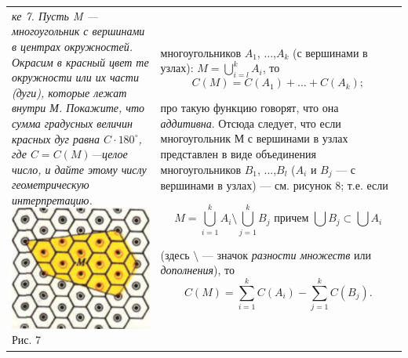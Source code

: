 \newpage
\thispagestyle{empty}
\begin{tabular}{p{50mm} p{120mm}}

\textit{ке 7. Пусть M --- многоугольник с вершинами в центрах окружностей. Окрасим в красный цвет те окружности или их части (дуги), которые лежат внутри М. Покажите, что сумма градусных величин красных дуг равна $C\cdot180^{\circ}$, где $C=C(M)$---целое число, и дайте этому числу геометрическую интерпретацию.}
\includegraphics[width=1.0\linewidth]{image2}
Рис. 7

&

многоугольников $A_1$, ...,$A_k$ (с вершинами в узлах):
{
\vspace{-4mm}
$M=\bigcup\limits_{i=l}^k A_i$, то $$C(M)=C(A_1)+...+C(A_k);$$
}

{
\vspace{-3mm}
про такую функцию говорят, что она \textit{аддитивна}. Отсюда следует, что если многоугольник М с вершинами в узлах представлен в виде объединения многоугольников $B_1$, ...,$B_l$ ($A_i$ и $B_j$ --- с вершинами в узлах) --- см. рисунок 8; т.е. если 
}

{
\vspace{-2mm}
\begin{equation*}
    M = \bigcup\limits_{i=1}^k A_i \setminus \bigcup\limits_{j=1}^k B_j\text{ причем }\bigcup B_j \subset \bigcup A_i
    \tag{*}
\end{equation*}
}

{
\vspace{-2mm}
(здесь $\setminus$ --- значок \textit{разности множеств} или \textit{дополнения}), то 
}
\vspace{-3mm}
$$C(M)=\sum\limits_{i=1}^kC(A_i) - \sum\limits_{j=1}^kC(B_j)\text{.}$$


\end{tabular}
